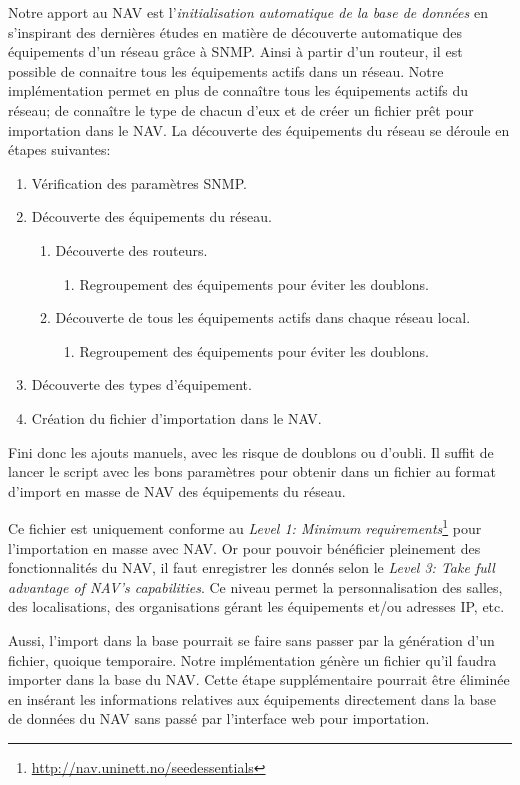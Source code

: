 Notre apport au NAV est l'\emph{initialisation automatique de la base de données} en s'inspirant des dernières études en matière de découverte automatique des équipements d'un réseau grâce à SNMP. Ainsi à partir d'un routeur, il est possible de connaitre tous les équipements actifs dans un réseau. Notre implémentation permet en plus de connaître tous les équipements actifs du réseau; de connaître le type de chacun d'eux et de créer un fichier prêt pour importation dans le NAV. La découverte des équipements du réseau se déroule en étapes suivantes:
\begin{enumerate}
 \item Vérification des paramètres SNMP.
 \item Découverte des équipements du réseau.
 \begin{enumerate}
  \item Découverte des routeurs.
   \begin{enumerate}
    \item Regroupement des équipements pour éviter les doublons.
   \end{enumerate}
  \item Découverte de tous les équipements actifs dans chaque réseau local.
  \begin{enumerate}
   \item Regroupement des équipements pour éviter les doublons.
  \end{enumerate}
 \end{enumerate}
 \item Découverte des types d'équipement.
 \item Création du fichier d'importation dans le NAV.
\end{enumerate}
Fini donc les ajouts manuels, avec les risque de doublons ou d'oubli. Il suffit de lancer le script avec les bons paramètres pour obtenir dans un fichier au format d'import en masse de NAV des équipements du réseau.

Ce fichier est uniquement conforme au \emph{Level 1: Minimum requirements}\footnote{\url{http://nav.uninett.no/seedessentials}} pour l'importation en masse avec NAV. Or pour pouvoir bénéficier pleinement des fonctionnalités du NAV, il faut enregistrer les donnés selon le \emph{Level 3: Take full advantage of NAV's capabilities}. Ce niveau permet la personnalisation des salles, des localisations, des organisations gérant les équipements et/ou adresses IP, etc. 

Aussi, l'import dans la base pourrait se faire sans passer par la génération d'un fichier, quoique temporaire. Notre implémentation génère un fichier qu'il faudra importer dans la base du NAV. Cette étape supplémentaire pourrait être éliminée en insérant les informations relatives aux équipements directement dans la base de données du NAV sans passé par l'interface web pour importation. 

